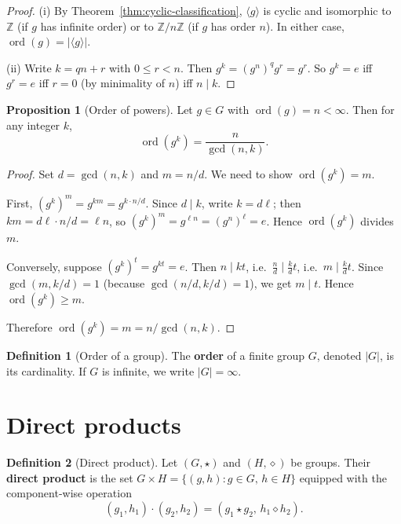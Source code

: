 \documentclass[12pt,a4paper,openany]{book}
\theoremstyle{definition}
\newtheorem{definition}{Definition}[chapter]
\newtheorem{proposition}{Proposition}[chapter]
\theoremstyle{remark}
\newcommand{\Z}{\mathbb{Z}}
\DeclareMathOperator{\ord}{ord}
\renewcommand{\gcd}{\operatorname{gcd}}
\begin{document}
\begin{proof}
(i) By Theorem~\ref{thm:cyclic-classification}, $\langle g\rangle$ is
cyclic and isomorphic to $\Z$ (if $g$ has infinite order) or to $\Z/n\Z$
(if $g$ has order $n$).  In either case, $\ord(g) = |\langle g\rangle|$.

(ii) Write $k=qn+r$ with $0\le r<n$.  Then $g^k=(g^n)^qg^r=g^r$.  So
$g^k=e$ iff $g^r=e$ iff $r=0$ (by minimality of $n$) iff $n\mid k$.
\end{proof}

\begin{proposition}[Order of powers]
\label{prop:order-powers}
Let $g\in G$ with $\ord(g)=n<\infty$.  Then for any integer $k$,
\[
  \ord(g^k) = \frac{n}{\gcd(n,k)}.
\]
\end{proposition}

\begin{proof}
Set $d=\gcd(n,k)$ and $m=n/d$.  We need to show $\ord(g^k)=m$.

First, $(g^k)^m = g^{km} = g^{k\cdot n/d}$.  Since $d\mid k$, write
$k=d\ell$; then $km = d\ell\cdot n/d = \ell n$, so $(g^k)^m = g^{\ell n}
= (g^n)^\ell = e$.  Hence $\ord(g^k)$ divides $m$.

Conversely, suppose $(g^k)^t = g^{kt} = e$.  Then $n\mid kt$, i.e.\
$\frac{n}{d}\mid\frac{k}{d}t$, i.e.\ $m\mid\frac{k}{d}t$.  Since
$\gcd(m,k/d)=1$ (because $\gcd(n/d,k/d)=1$), we get $m\mid t$.  Hence
$\ord(g^k)\ge m$.

Therefore $\ord(g^k)=m=n/\gcd(n,k)$.
\end{proof}

\begin{definition}[Order of a group]
\label{def:order-group}
The \textbf{order} of a finite group $G$, denoted $|G|$, is its
cardinality.  If $G$ is infinite, we write $|G|=\infty$.
\end{definition}

\section{Direct products}
\label{sec:ch1-direct-product}

\begin{definition}[Direct product]
\label{def:direct-product}
Let $(G,\star)$ and $(H,\diamond)$ be groups.  Their \textbf{direct
product} is the set $G\times H = \{(g,h) : g\in G,\, h\in H\}$ equipped
with the component-wise operation
\[
  (g_1,h_1)\cdot(g_2,h_2) = (g_1\star g_2,\, h_1\diamond h_2).
\]
\end{definition}
\end{document}
